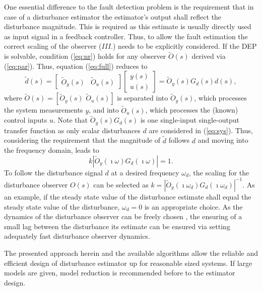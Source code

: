 \documentclass[graybox]{svmult}
\begin{document}
One essential difference to the fault detection problem is the requirement that in case of a disturbance estimator the estimator's output shall reflect the disturbance magnitude. This is required  as this estimate is usually directly used as input signal in a feedback controller. Thus, to allow the fault estimation  the correct scaling of the observer ($III$.) needs to be explicitly considered.
If the DEP is solvable, condition (\ref{eq:nr}) holds for any observer $\tilde O(s)$ derived via  (\ref{eq:par}). Thus, equation (\ref{eq:full}) reduces to
\begin{equation}
	\tilde d(s) = 
	\begin{bmatrix}
		\tilde O_y(s) & \tilde O_u(s) 
	\end{bmatrix}
	\begin{bmatrix}
		y(s) \\ u(s)
	\end{bmatrix}  =  \tilde O_y(s) G_{ d}(s)  d(s),
\end{equation}
where $\tilde O(s)  = [\tilde O_y(s) \,\, \tilde O_u(s) ]$ is separated into $\tilde O_y(s)$, which processes the system measurements $y$, and into $\tilde O_u(s)$, which processes the (known) control inputs $u$.
Note that $\tilde O_y(s) G_{ d}(s)$ is one single-input single-output transfer function as only scalar disturbances $d$ are considered in (\ref{eq:sys}). Thus, considering the requirement that the magnitude of $\tilde d$ follows $d$ and moving into the frequency domain, leads to 
\begin{equation}
	k |\tilde O_y(\imath \omega) G_{d}(\imath \omega)|  = 1.
\end{equation}
To follow the disturbance signal $d$ at a desired  frequency $\omega_d$, the scaling for the disturbance observer $O(s)$ can be selected as $k  = |\tilde O_y(\imath \omega_d) G_{d}(\imath \omega_d)|^{-1}$.
As an example, if the steady state value of the disturbance estimate shall equal the steady state value of the disturbance, $\omega_d = 0$ is an appropriate choice. As the dynamics of the  disturbance observer can be freely chosen \cite{Varga17}, the ensuring of a small lag between the disturbance its estimate can be ensured via setting adequately fast disturbance observer dynamics.

The presented approach herein and the available algorithms allow the reliable and efficient design of disturbance estimator up for reasonable sized systems. If large models are given, model reduction is recommended before to the estimator design. 
\end{document}

